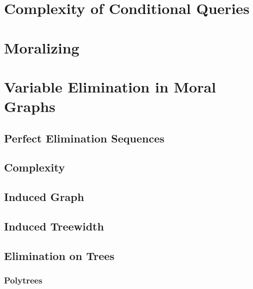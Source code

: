 	\section{Complexity of Conditional Queries} %

	\section{Moralizing} %

	\section{Variable Elimination in Moral Graphs} %

		\subsection{Perfect Elimination Sequences} %

		\subsection{Complexity} %

		\subsection{Induced Graph} %

		\subsection{Induced Treewidth} %
			\label{subsec:treewidth}


		\subsection{Elimination on Trees} %

			\subsubsection{Polytrees} %


